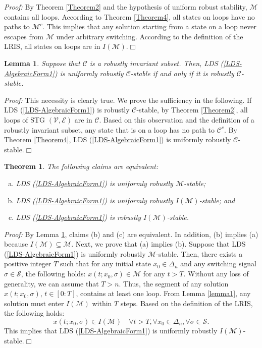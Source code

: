 \documentclass[11pt,onecolumn]{article}
\newtheorem{theorem}{Theorem}
\newtheorem{lemma}{Lemma}
\begin{document}
{\it Proof:} By Theorem \ref{Theorem2} and the hypothesis of uniform robust stability, $\mathcal M$ contains all loops. According to Theorem \ref{Theorem4}, all states on loops have no paths to $\mathcal M^c$. This implies that any solution starting from a state on a loop never escapes from $\mathcal M$ under arbitrary switching. According to the definition of the LRIS, all states on loops are in $I(\mathcal M)$.\hfill$\Box$


\begin{lemma}\label{lemma2}
   Suppose that $\mathcal C$ is a robustly invariant subset. Then, LDS (\ref{LDS-AlgebraicForm1}) is uniformly robustly $\mathcal C$-stable if and only if it is robustly $\mathcal C$-stable.
\end{lemma}

{\it Proof:} This necessity is clearly true. We prove the sufficiency in the following. If LDS (\ref{LDS-AlgebraicForm1}) is robustly $\mathcal C$-stable, by Theorem \ref{Theorem2}, all loops of STG $(\mathcal V,\mathcal E)$ are in $\mathcal C$. Based on this observation and the definition of a robustly invariant subset, any state that is on a loop has no path to $\mathcal C^c$. By Theorem \ref{Theorem4}, LDS (\ref{LDS-AlgebraicForm1}) is uniformly robustly $\mathcal C$-stable.\hfill$\Box$



\begin{theorem}\label{Theorem5}
The following claims are equivalent:
\begin{enumerate}[(a)]
  \item LDS (\ref{LDS-AlgebraicForm1}) is uniformly robustly $\mathcal M$-stable;
   \item LDS (\ref{LDS-AlgebraicForm1}) is uniformly robustly $I(\mathcal M)$-stable; and
      \item LDS (\ref{LDS-AlgebraicForm1}) is robustly $I(\mathcal M)$-stable.
\end{enumerate}

\end{theorem}

{\it Proof:} By Lemma \ref{lemma2}, claims (b) and (c) are equivalent. In addition, (b) implies (a) because $I(\mathcal M)\subseteq\mathcal M$. Next, we prove that (a) implies (b). Suppose that LDS (\ref{LDS-AlgebraicForm1}) is uniformly robustly $\mathcal M$-stable. Then, there exists a positive integer $T$ such that for any initial state $  x_0\in\Delta_n$ and any switching signal $\sigma\in\mathcal S$, the following holds: $  x(t;  x_0,\sigma)\in\mathcal M$ for any $t>T$. Without any loss of generality, we can assume that $T>n$. Thus, the segment of any solution $  x(t;  x_0,\sigma)$, $t\in[0:T]$, contains at least one loop. From Lemma \ref{lemma1},
 any solution must enter $I(\mathcal M)$ within $T$ steps. Based on the definition of the LRIS, the following holds:
\[  x(t;  x_0,\sigma)\in I(\mathcal M)\quad \forall t>T, \forall   x_0\in\Delta_n, \forall \sigma\in\mathcal S.\]
This implies that LDS (\ref{LDS-AlgebraicForm1}) is uniformly robustly $I(\mathcal M)$-stable.\hfill $\Box$
\end{document}
